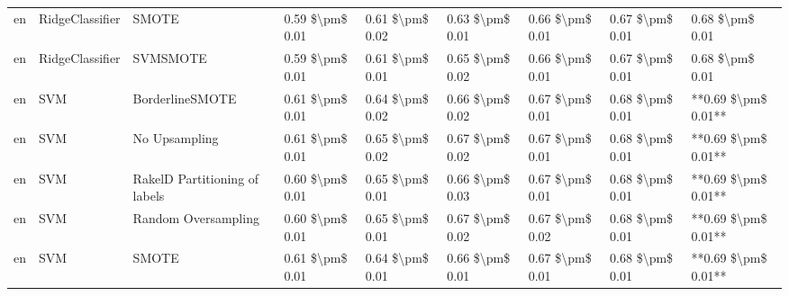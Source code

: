 \begin{tabular}{lllllllll}
      en &                 RidgeClassifier &                         SMOTE & 0.59 \$\textbackslash pm\$ 0.01 &           0.61 \$\textbackslash pm\$ 0.02 &       0.63 \$\textbackslash pm\$ 0.01 &        0.66 \$\textbackslash pm\$ 0.01 &                         0.67 \$\textbackslash pm\$ 0.01 &     0.68 \$\textbackslash pm\$ 0.01 \\
      en &                 RidgeClassifier &                      SVMSMOTE & 0.59 \$\textbackslash pm\$ 0.01 &           0.61 \$\textbackslash pm\$ 0.01 &       0.65 \$\textbackslash pm\$ 0.02 &        0.66 \$\textbackslash pm\$ 0.01 &                         0.67 \$\textbackslash pm\$ 0.01 &     0.68 \$\textbackslash pm\$ 0.01 \\
      en &                             SVM &               BorderlineSMOTE & 0.61 \$\textbackslash pm\$ 0.01 &           0.64 \$\textbackslash pm\$ 0.02 &       0.66 \$\textbackslash pm\$ 0.02 &        0.67 \$\textbackslash pm\$ 0.01 &                         0.68 \$\textbackslash pm\$ 0.01 & **0.69 \$\textbackslash pm\$ 0.01** \\
      en &                             SVM &                 No Upsampling & 0.61 \$\textbackslash pm\$ 0.01 &           0.65 \$\textbackslash pm\$ 0.02 &       0.67 \$\textbackslash pm\$ 0.02 &        0.67 \$\textbackslash pm\$ 0.01 &                         0.68 \$\textbackslash pm\$ 0.01 & **0.69 \$\textbackslash pm\$ 0.01** \\
      en &                             SVM & RakelD Partitioning of labels & 0.60 \$\textbackslash pm\$ 0.01 &           0.65 \$\textbackslash pm\$ 0.01 &       0.66 \$\textbackslash pm\$ 0.03 &        0.67 \$\textbackslash pm\$ 0.01 &                         0.68 \$\textbackslash pm\$ 0.01 & **0.69 \$\textbackslash pm\$ 0.01** \\
      en &                             SVM &           Random Oversampling & 0.60 \$\textbackslash pm\$ 0.01 &           0.65 \$\textbackslash pm\$ 0.01 &       0.67 \$\textbackslash pm\$ 0.02 &        0.67 \$\textbackslash pm\$ 0.02 &                         0.68 \$\textbackslash pm\$ 0.01 & **0.69 \$\textbackslash pm\$ 0.01** \\
      en &                             SVM &                         SMOTE & 0.61 \$\textbackslash pm\$ 0.01 &           0.64 \$\textbackslash pm\$ 0.01 &       0.66 \$\textbackslash pm\$ 0.01 &        0.67 \$\textbackslash pm\$ 0.01 &                         0.68 \$\textbackslash pm\$ 0.01 & **0.69 \$\textbackslash pm\$ 0.01** \\

\end{tabular}
